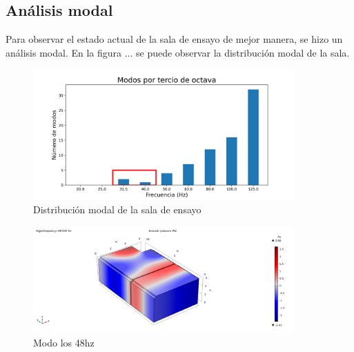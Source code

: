 \subsection{Análisis modal}
Para observar el estado actual de la sala de ensayo de mejor manera, se hizo un análisis modal. En la figura ... se puede observar la distribución modal de la sala.
\begin{figure}[H]
    \centering
    \includegraphics[width=10cm]{Imagenes/Modos/densidad modal.png}
    \caption{Distribución modal de la sala de ensayo}
    \label{fig:distribucion modal}
\end{figure}

\begin{figure}[H]
    \centering
    \includegraphics[width=10cm]{Imagenes/Modos/modo_48hz.png}
    \caption{Modo los 48hz}
    \label{fig:modo a los 48hz}
\end{figure}
